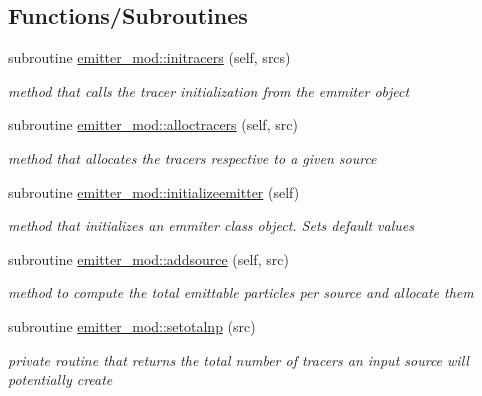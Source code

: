 \subsection*{Functions/\+Subroutines}
\begin{DoxyCompactItemize}
\item 
subroutine \mbox{\hyperlink{namespaceemitter__mod_ad89dfc083eae7362441c353225a74ebc}{emitter\+\_\+mod\+::initracers}} (self, srcs)
\begin{DoxyCompactList}\small\item\em method that calls the tracer initialization from the emmiter object \end{DoxyCompactList}\item 
subroutine \mbox{\hyperlink{namespaceemitter__mod_a7c677125988390e4c57909e4ea82d902}{emitter\+\_\+mod\+::alloctracers}} (self, src)
\begin{DoxyCompactList}\small\item\em method that allocates the tracers respective to a given source \end{DoxyCompactList}\item 
subroutine \mbox{\hyperlink{namespaceemitter__mod_a6376ad0f8e1739b29caf672aa0750373}{emitter\+\_\+mod\+::initializeemitter}} (self)
\begin{DoxyCompactList}\small\item\em method that initializes an emmiter class object. Sets default values \end{DoxyCompactList}\item 
subroutine \mbox{\hyperlink{namespaceemitter__mod_ab704fb0e2eb9b3b4b9542706b6fb4eaf}{emitter\+\_\+mod\+::addsource}} (self, src)
\begin{DoxyCompactList}\small\item\em method to compute the total emittable particles per source and allocate them \end{DoxyCompactList}\item 
subroutine \mbox{\hyperlink{namespaceemitter__mod_a5c219dd6692a761ad4bf968ae750fcc6}{emitter\+\_\+mod\+::setotalnp}} (src)
\begin{DoxyCompactList}\small\item\em private routine that returns the total number of tracers an input source will potentially create \end{DoxyCompactList}\end{DoxyCompactItemize}
